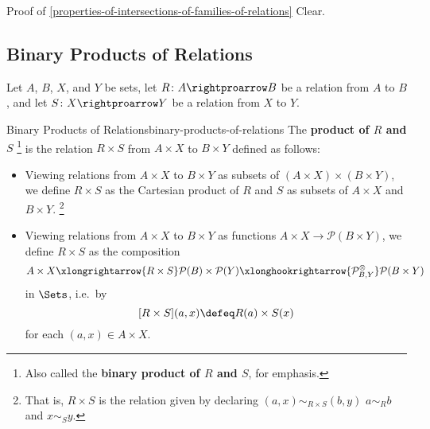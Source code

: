 \begin{Proof}{Proof of \cref{properties-of-intersections-of-families-of-relations}}%
    Clear.
\end{Proof}
\subsection{Binary Products of Relations}\label{subsection-binary-products-of-relations}
Let $A$, $B$, $X$, and $Y$ be sets, let $R\colon A\rightproarrow B$ be a relation from $A$ to $B$, and let $S\colon X\rightproarrow Y$ be a relation from $X$ to $Y$.
\begin{definition}{Binary Products of Relations}{binary-products-of-relations}%
    The \textbf{product of $R$ and $S$}%
    \footnote{%
        Also called the \textbf{binary product of $R$ and $S$}, for emphasis.
        \par\vspace*{-1.75\baselineskip}
    } %
    is the relation $R\times S$ from $A\times X$ to $B\times Y$ defined as follows:
    \begin{itemize}
        \item Viewing relations from $A\times X$ to $B\times Y$ as subsets of $(A\times X)\times(B\times Y)$, we define $R\times S$ as the Cartesian product of $R$ and $S$ as subsets of $A\times X$ and $B\times Y$.%
            \footnote{%
                That is, $R\times S$ is the relation given by declaring $(a,x)\sim_{R\times S}(b,y)$ \textiff $a\sim_{R}b$ and $x\sim_{S}y$.
                \par\vspace*{-1.75\baselineskip}
            }%
        \item Viewing relations from $A\times X$ to $B\times Y$ as functions $A\times X\to\mathcal{P}(B\times Y)$, we define $R\times S$ as the composition
            \[
                A\times X
                \xlongrightarrow{R\times S}
                \mathcal{P}(B)\times\mathcal{P}(Y)
                \xlonghookrightarrow{\mathcal{P}^{\otimes}_{B,Y}}
                \mathcal{P}(B\times Y)
            \]%
            in $\Sets$, i.e.\ by
            \[
                [R\times S](a,x)
                \defeq
                R(a)\times S(x)
            \]%
            for each $(a,x)\in A\times X$.
    \end{itemize}
\end{definition}

